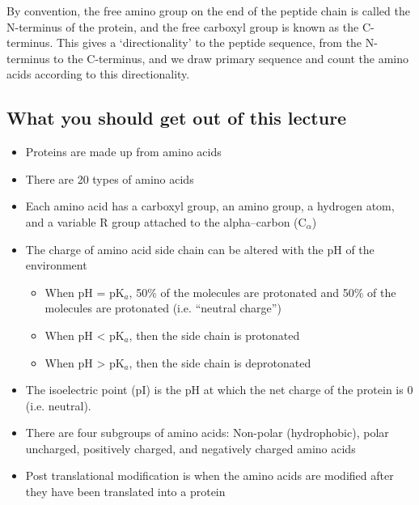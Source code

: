 By convention, the free amino group on the end of the peptide chain is called the N-terminus of the protein, and the free carboxyl group is known as the C-terminus.
This gives a `directionality' to the peptide sequence, from the N-terminus to the C-terminus, and we draw primary sequence and count the amino acids according to this directionality.

\begin{center}
\end{center}

\subsection*{What you should get out of this lecture}

\begin{itemize}
	\item Proteins are made up from amino acids
	\item There are 20 types of amino acids
	\item Each amino acid has a carboxyl group, an amino group, a hydrogen atom, and a variable R group attached to the alpha--carbon (C$_{\alpha}$)
	\item The charge of amino acid side chain can be altered with the pH of the environment
		\begin{itemize}
			\item When pH = pK$_a$, 50\% of the molecules are protonated and 50\% of the molecules are protonated (i.e. ``neutral charge'')
			\item When pH \textless{} pK$_a$, then the side chain is protonated
			\item When pH \textgreater{} pK$_a$, then the side chain is deprotonated
		\end{itemize}
	\item The isoelectric point (pI) is the pH at which the net charge of the protein is 0 (i.e. neutral).
	\item There are four subgroups of amino acids: Non-polar (hydrophobic), polar uncharged, positively charged, and negatively charged amino acids
	\item Post translational modification is when the amino acids are modified after they have been translated into a protein
\end{itemize}

